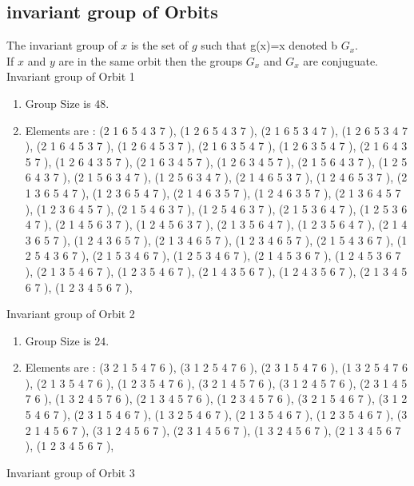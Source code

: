 \documentclass[12pt]{article}
\begin{document}
\subsection{invariant group of Orbits}
\noindent The invariant group of $x$ is the set of $g$ such that g(x)=x denoted b $G_x$.\\
If $x$ and $y$ are in the same orbit then the groups $G_x$ and  $G_x$ are conjuguate.\\
Invariant group of Orbit 1
\begin{enumerate}
\item Group Size is $48$.
\item Elements are : (2 1 6 5 4 3 7  ), (1 2 6 5 4 3 7  ), (2 1 6 5 3 4 7  ), (1 2 6 5 3 4 7  ), (2 1 6 4 5 3 7  ), (1 2 6 4 5 3 7  ), (2 1 6 3 5 4 7  ), (1 2 6 3 5 4 7  ), (2 1 6 4 3 5 7  ), (1 2 6 4 3 5 7  ), (2 1 6 3 4 5 7  ), (1 2 6 3 4 5 7  ), (2 1 5 6 4 3 7  ), (1 2 5 6 4 3 7  ), (2 1 5 6 3 4 7  ), (1 2 5 6 3 4 7  ), (2 1 4 6 5 3 7  ), (1 2 4 6 5 3 7  ), (2 1 3 6 5 4 7  ), (1 2 3 6 5 4 7  ), (2 1 4 6 3 5 7  ), (1 2 4 6 3 5 7  ), (2 1 3 6 4 5 7  ), (1 2 3 6 4 5 7  ), (2 1 5 4 6 3 7  ), (1 2 5 4 6 3 7  ), (2 1 5 3 6 4 7  ), (1 2 5 3 6 4 7  ), (2 1 4 5 6 3 7  ), (1 2 4 5 6 3 7  ), (2 1 3 5 6 4 7  ), (1 2 3 5 6 4 7  ), (2 1 4 3 6 5 7  ), (1 2 4 3 6 5 7  ), (2 1 3 4 6 5 7  ), (1 2 3 4 6 5 7  ), (2 1 5 4 3 6 7  ), (1 2 5 4 3 6 7  ), (2 1 5 3 4 6 7  ), (1 2 5 3 4 6 7  ), (2 1 4 5 3 6 7  ), (1 2 4 5 3 6 7  ), (2 1 3 5 4 6 7  ), (1 2 3 5 4 6 7  ), (2 1 4 3 5 6 7  ), (1 2 4 3 5 6 7  ), (2 1 3 4 5 6 7  ), (1 2 3 4 5 6 7  ), 
\end{enumerate}
Invariant group of Orbit 2
\begin{enumerate}
\item Group Size is $24$.
\item Elements are : (3 2 1 5 4 7 6  ), (3 1 2 5 4 7 6  ), (2 3 1 5 4 7 6  ), (1 3 2 5 4 7 6  ), (2 1 3 5 4 7 6  ), (1 2 3 5 4 7 6  ), (3 2 1 4 5 7 6  ), (3 1 2 4 5 7 6  ), (2 3 1 4 5 7 6  ), (1 3 2 4 5 7 6  ), (2 1 3 4 5 7 6  ), (1 2 3 4 5 7 6  ), (3 2 1 5 4 6 7  ), (3 1 2 5 4 6 7  ), (2 3 1 5 4 6 7  ), (1 3 2 5 4 6 7  ), (2 1 3 5 4 6 7  ), (1 2 3 5 4 6 7  ), (3 2 1 4 5 6 7  ), (3 1 2 4 5 6 7  ), (2 3 1 4 5 6 7  ), (1 3 2 4 5 6 7  ), (2 1 3 4 5 6 7  ), (1 2 3 4 5 6 7  ), 
\end{enumerate}
Invariant group of Orbit 3
\end{document}
